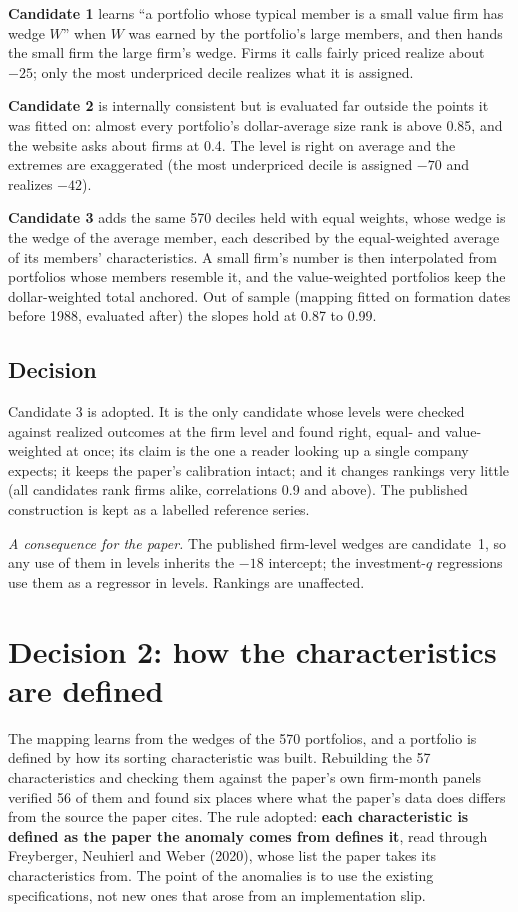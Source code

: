 \documentclass[11pt]{article}
\begin{document}
\textbf{Candidate 1} learns ``a portfolio whose typical member is a small
value firm has wedge $W$'' when $W$ was earned by the portfolio's large
members, and then hands the small firm the large firm's wedge. Firms it
calls fairly priced realize about $-25$\pp; only the most underpriced decile
realizes what it is assigned.

\textbf{Candidate 2} is internally consistent but is evaluated far outside
the points it was fitted on: almost every portfolio's dollar-average size
rank is above 0.85, and the website asks about firms at 0.4. The level is
right on average and the extremes are exaggerated (the most underpriced
decile is assigned $-70$\pp{} and realizes $-42$).

\textbf{Candidate 3} adds the same 570 deciles held with equal weights, whose
wedge is the wedge of the average member, each described by the
equal-weighted average of its members' characteristics. A small firm's
number is then interpolated from portfolios whose members resemble it, and
the value-weighted portfolios keep the dollar-weighted total anchored. Out
of sample (mapping fitted on formation dates before 1988, evaluated after)
the slopes hold at 0.87 to 0.99.

\subsection*{Decision}

Candidate 3 is adopted. It is the only candidate whose levels were checked
against realized outcomes at the firm level and found right, equal- and
value-weighted at once; its claim is the one a reader looking up a single
company expects; it keeps the paper's calibration intact; and it changes
rankings very little (all candidates rank firms alike, correlations 0.9 and
above). The published construction is kept as a labelled reference series.

\emph{A consequence for the paper.} The published firm-level wedges are
candidate~1, so any use of them in levels inherits the $-18$\pp{} intercept;
the investment-$q$ regressions use them as a regressor in levels. Rankings
are unaffected.

\section{Decision 2: how the characteristics are defined}

The mapping learns from the wedges of the 570 portfolios, and a portfolio is
defined by how its sorting characteristic was built. Rebuilding the 57
characteristics and checking them against the paper's own firm-month panels
verified 56 of them and found six places where what the paper's data does
differs from the source the paper cites. The rule adopted: \textbf{each
characteristic is defined as the paper the anomaly comes from defines it},
read through Freyberger, Neuhierl and Weber (2020), whose list the paper
takes its characteristics from. The point of the anomalies is to use the
existing specifications, not new ones that arose from an implementation
slip.
\end{document}
